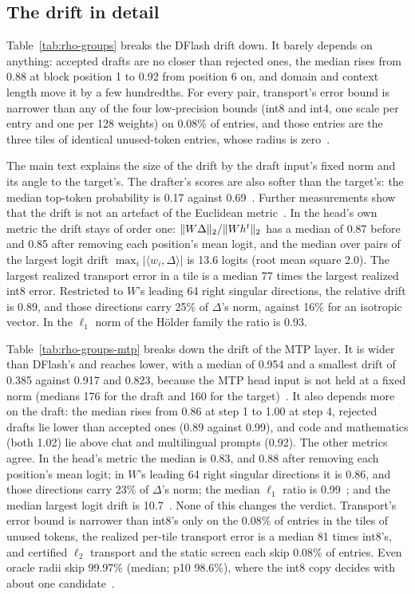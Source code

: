 \subsection{The drift in detail}\label{app:transport-drift}
Table~\ref{tab:rho-groups} breaks the DFlash drift down. It barely depends on anything: accepted drafts are no closer than rejected ones, the median rises from 0.88 at block position 1 to 0.92 from position 6 on, and domain and context length move it by a few hundredths. For every pair, transport's error bound is narrower than any of the four low-precision bounds (int8 and int4, one scale per entry and one per 128 weights) on 0.08\% of entries, and those entries are the three tiles of identical unused-token entries, whose radius is zero~.

The main text explains the size of the drift by the draft input's fixed norm and its angle to the target's. The drafter's scores are also softer than the target's: the median top-token probability is 0.17 against 0.69~. Further measurements show that the drift is not an artefact of the Euclidean metric~. In the head's own metric the drift stays of order one: $\lVert W\Delta\rVert_2/\lVert Wh^t\rVert_2$ has a median of 0.87 before and 0.85 after removing each position's mean logit, and the median over pairs of the largest logit drift $\max_i|\langle w_i,\Delta\rangle|$ is 13.6 logits (root mean square 2.0). The largest realized transport error in a tile is a median 77 times the largest realized int8 error. Restricted to $W$'s leading 64 right singular directions, the relative drift is 0.89, and those directions carry 25\% of $\Delta$'s norm, against 16\% for an isotropic vector. In the $\ell_1$ norm of the Hölder family the ratio is 0.93.

Table~\ref{tab:rho-groups-mtp} breaks down the drift of the MTP layer. It is wider than DFlash's and reaches lower, with a median of 0.954 and a smallest drift of 0.385 against 0.917 and 0.823, because the MTP head input is not held at a fixed norm (medians 176 for the draft and 160 for the target)~. It also depends more on the draft: the median rises from 0.86 at step 1 to 1.00 at step 4, rejected drafts lie lower than accepted ones (0.89 against 0.99), and code and mathematics (both 1.02) lie above chat and multilingual prompts (0.92). The other metrics agree. In the head's metric the median is 0.83, and 0.88 after removing each position's mean logit; in $W$'s leading 64 right singular directions it is 0.86, and those directions carry 23\% of $\Delta$'s norm; the median $\ell_1$ ratio is 0.99~; and the median largest logit drift is 10.7~. None of this changes the verdict. Transport's error bound is narrower than int8's only on the 0.08\% of entries in the tiles of unused tokens, the realized per-tile transport error is a median 81 times int8's, and certified $\ell_2$ transport and the static screen each skip 0.08\% of entries. Even oracle radii skip 99.97\% (median; p10 98.6\%), where the int8 copy decides with about one candidate~.

